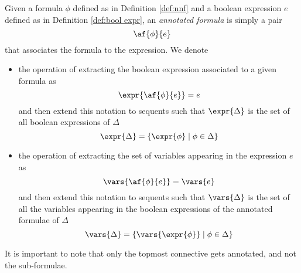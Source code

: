 \begin{define}
	\label{def:annotated}
	Given a formula $\phi$ defined as in Definition \ref{def:nnf} and a boolean expression $e$ defined as in Definition \ref{def:bool expr}, an \textit{annotated formula} is simply a pair
	$$ \af{\phi}{e} $$
	that associates the formula to the expression.
	We denote 
	\begin{itemize}
		\item the operation of extracting the boolean expression associated to a given formula as
			$$ \expr{\af{\phi}{e}} = e $$
			and then extend this notation to sequents such that $ \expr{\Delta} $ is the set of all boolean expressions of $\Delta$
			$$ \expr{\Delta} = \{ \expr{\phi} \mid \phi \in \Delta \} $$
		\item the operation of extracting the set of variables appearing in the expression $e$ as
			$$\vars{\af{\phi}{e}} = \vars{e} $$
			and then extend this notation to sequents such that $\vars{\Delta}$ is the set of all the variables appearing in the boolean expressions of the annotated formulae of $\Delta$
			$$ \vars{\Delta} = \{ \vars{\expr{\phi}} \mid \phi \in \Delta \} $$
	\end{itemize}
\end{define}
It is important to note that only the topmost connective gets annotated, and not the sub-formulae.


